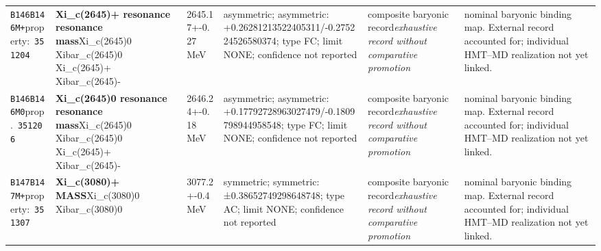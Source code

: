 \begin{landscape}
\begin{longtable}{L{1.85cm}L{4.45cm}L{2.35cm}L{4.05cm}L{3.35cm}L{7.15cm}}
\texttt{B146}\newline \texttt{B146M+}\newline property:\ \texttt{351204} & \textbf{Xi\_\allowbreak{}c(2645)+ resonance resonance mass}\newline Xi\_\allowbreak{}c(2645)0 \textbar{}\allowbreak{} Xibar\_\allowbreak{}c(2645)0 \textbar{}\allowbreak{} Xi\_\allowbreak{}c(2645)+ \textbar{}\allowbreak{} Xibar\_\allowbreak{}c(2645)- & 2645.17+-0.27\,MeV & asymmetric; asymmetric: +0.26281213522405311/-0.275224526580374; type FC; limit NONE; confidence not reported & composite baryonic record\newline \emph{exhaustive record without comparative promotion} & nominal baryonic binding map. External record accounted for; individual HMT--MD realization not yet linked. \\
\texttt{B146}\newline \texttt{B146M0}\newline prop.\ \texttt{351206} & \textbf{Xi\_\allowbreak{}c(2645)0 resonance resonance mass}\newline Xi\_\allowbreak{}c(2645)0 \textbar{}\allowbreak{} Xibar\_\allowbreak{}c(2645)0 \textbar{}\allowbreak{} Xi\_\allowbreak{}c(2645)+ \textbar{}\allowbreak{} Xibar\_\allowbreak{}c(2645)- & 2646.24+-0.18\,MeV & asymmetric; asymmetric: +0.17792728963027479/-0.1809798944958548; type FC; limit NONE; confidence not reported & composite baryonic record\newline \emph{exhaustive record without comparative promotion} & nominal baryonic binding map. External record accounted for; individual HMT--MD realization not yet linked. \\
\texttt{B147}\newline \texttt{B147M+}\newline property:\ \texttt{351307} & \textbf{Xi\_\allowbreak{}c(3080)+ MASS}\newline Xi\_\allowbreak{}c(3080)0 \textbar{}\allowbreak{} Xibar\_\allowbreak{}c(3080)0 & 3077.2+-0.4\,MeV & symmetric; symmetric: ±0.38652749298648748; type AC; limit NONE; confidence not reported & composite baryonic record\newline \emph{exhaustive record without comparative promotion} & nominal baryonic binding map. External record accounted for; individual HMT--MD realization not yet linked. \\

\end{longtable}
\end{landscape}
